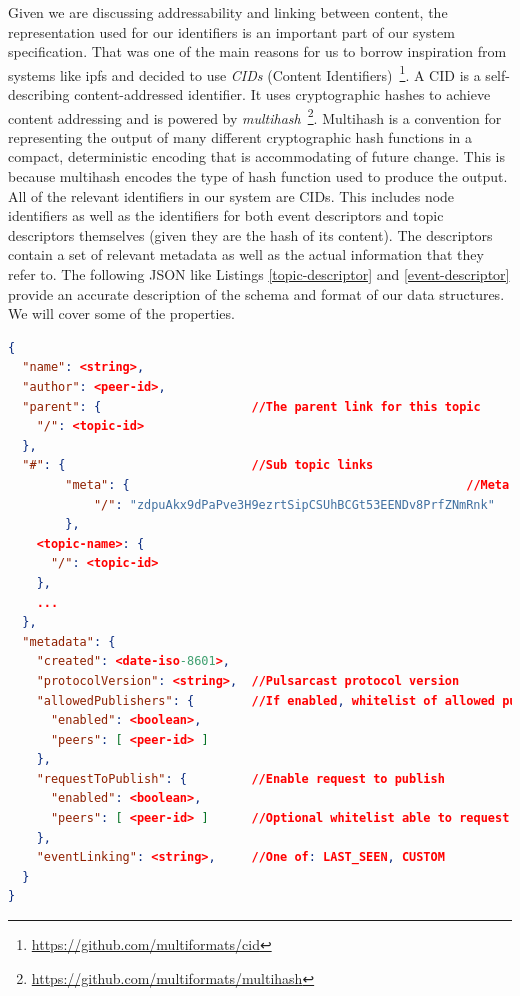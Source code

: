 Given we are discussing addressability and linking between content, the
representation used for our identifiers is an important part of our system
specification. That was one of the main reasons for us to borrow inspiration
from systems like \acrshort{ipfs} and decided to use \emph{CIDs} (Content
Identifiers)~\footnote{\url{https://github.com/multiformats/cid}}.  A CID is a
self-describing content-addressed identifier. It uses cryptographic hashes to
achieve content addressing and is powered by
\emph{multihash}~\footnote{\url{https://github.com/multiformats/multihash}}.
Multihash is a convention for representing the output of many different
cryptographic hash functions in a compact, deterministic encoding that is
accommodating of future change. This is because multihash encodes the type of
hash function used to produce the output. All of the relevant identifiers in
our system are CIDs. This includes node identifiers as well as the identifiers
for both event descriptors and topic descriptors themselves (given they are the
hash of its content). The descriptors contain a set of relevant metadata as
well as the actual information that they refer to. The following JSON like
Listings \ref{topic-descriptor} and \ref{event-descriptor} provide an accurate
description of the schema and format of our data structures. We will cover some
of the properties.

\begin{lstlisting}[float, language=JSON,caption={Topic descriptor schema in a JSON based format},label={topic-descriptor}]
{
  "name": <string>,
  "author": <peer-id>,
  "parent": {                     //The parent link for this topic
    "/": <topic-id>
  },
  "#": {                          //Sub topic links
		"meta": {												//Meta topic
			"/": "zdpuAkx9dPaPve3H9ezrtSipCSUhBCGt53EENDv8PrfZNmRnk"
		},
    <topic-name>: {
      "/": <topic-id>
    },
    ...
  },
  "metadata": {
    "created": <date-iso-8601>,
    "protocolVersion": <string>,  //Pulsarcast protocol version
    "allowedPublishers": {        //If enabled, whitelist of allowed publishers
      "enabled": <boolean>,
      "peers": [ <peer-id> ]
    },
    "requestToPublish": {         //Enable request to publish
      "enabled": <boolean>,
      "peers": [ <peer-id> ]      //Optional whitelist able to request
    },
    "eventLinking": <string>,     //One of: LAST_SEEN, CUSTOM
  }
}
\end{lstlisting}

